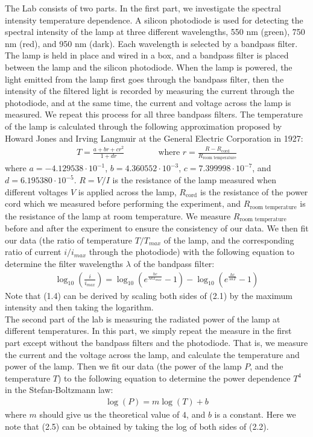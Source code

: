 \documentclass[11pt]{book}
\theoremstyle{break}
\theoremstyle{break}
\newcommand{\ee}[1]{\cdot 10^{#1}}
\begin{document}
The Lab consists of two parts. In the first part, we investigate the spectral intensity temperature dependence. A silicon photodiode is used for detecting the spectral intensity of the lamp at three different wavelengths, 550 nm (green), 750 nm (red), and 950 nm (dark).  Each wavelength is selected by a bandpass filter. The lamp is held in place and wired in a box, and a bandpass filter is placed between the lamp and the silicon photodiode. When the lamp is powered, the light emitted from the lamp first goes through the bandpass filter, then the intensity of the filtered light is recorded by measuring the current through the photodiode, and at the same time, the current and voltage across the lamp is measured. We repeat this process for all three bandpass filters. The temperature of the lamp is calculated through the following approximation proposed by Howard Jones and Irving Langmuir at the General Electric Corporation in 1927:
\begin{align*}
T = \frac{a+br + cr^2}{1+dr} \qquad\qquad\text{where }r=\frac{R-R_{\text{cord}}}{R_{\text{room temperature}}} \tag{T}
\end{align*} 
where $a=-4.129538\ee{-1}$, $b=4.360552\ee{-3}$, $c=7.399998\ee{-7}$, and $d =6.195380\ee{-5}$. $R = V/I$ is the resistance of the lamp measured when different voltages $V$ is applied across the lamp, $R_{\text{cord}}$ is the resistance of the power cord which we measured before performing the experiment, and $R_{\text{room temperature}}$ is the resistance of the lamp at room temperature. We measure $R_{\text{room temperature}}$ before and after the experiment to ensure the consistency of our data. We then fit our data (the ratio of temperature $T/T_{max}$ of the lamp, and the corresponding ratio of current $i/i_{max}$ through the photodiode) with the following equation to determine the filter wavelengths $\lambda$ of the bandpass filter:
\begin{align}
\log_{10}\left( \frac{i}{i_{max}}\right) = \log_{10}\left( e^{\frac{hc}{\lambda kT_{max}}} - 1\right) -\log_{10}\left(e^{\frac{hc}{\lambda kT}} - 1\right)
\end{align}  
Note that (1.4) can be derived by scaling both sides of (2.1) by the maximum intensity and then taking the logarithm.\\

The second part of the lab is measuring the radiated power of the lamp at different temperatures. In this part, we simply repeat the measure in the first part except without the bandpass filters and the photodiode. That is, we measure the current and the voltage across the lamp, and calculate the temperature and power of the lamp. Then we fit our data (the power of the lamp $P$, and the temperature $T$) to the following equation to determine the power dependence $T^4$ in the Stefan-Boltzmann law:
\begin{align}
\log(P) = m \log(T) +b
\end{align}
where $m$ should give us the theoretical value of $4$, and $b$ is a constant. Here we note that (2.5) can be obtained by taking the log of both sides of (2.2). 
\end{document}
